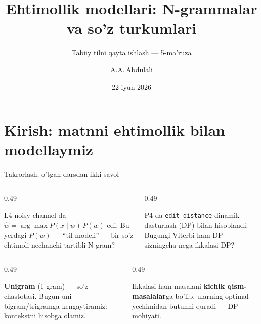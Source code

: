 \documentclass[aspectratio=169,11pt]{beamer}
\title[N-gram va teglash]{Ehtimollik modellari: N-grammalar va so'z turkumlari}
\subtitle{Tabiiy tilni qayta ishlash --- 5-ma'ruza}
\author[A.A.\,Abdulali]{A.A.\,Abdulali}
\date{22-iyun 2026}
\institute{11:00--12:20 \quad$\cdot$\quad mavzu \textnumero{}5}
\begin{document}

\maketitle

\section[Kirish]{Kirish: matnni ehtimollik bilan modellaymiz}

\begin{frame}{Takrorlash: o'tgan darsdan ikki savol}
  \begin{columns}[T]
    \begin{column}{0.49\textwidth}
      \begin{tcolorbox}[warnbox,title=1-savol]
        \small
        L4 noisy channel da $\hat{w}=\arg\max P(x{\mid}w)\,P(w)$ edi.
        Bu yerdagi $P(w)$ --- ``til modeli'' --- bir so'z ehtimoli nechanchi
        tartibli N-gram?
      \end{tcolorbox}
    \end{column}
    \begin{column}{0.49\textwidth}
      \begin{tcolorbox}[warnbox,title=2-savol]
        \small
        P4 da \texttt{edit\_distance} dinamik dasturlash (DP) bilan
        hisoblandi. Bugungi Viterbi ham DP --- sizningcha nega ikkalasi DP?
      \end{tcolorbox}
    \end{column}
  \end{columns}
  \pause
  \vspace{4pt}
  \begin{columns}[T]
    \begin{column}{0.49\textwidth}
      \begin{tcolorbox}[okbox,title=1-javob]
        \small
        \textbf{Unigram} (1-gram) --- so'z chastotasi. Bugun uni
        bigram/trigramga kengaytiramiz: kontekstni hisobga olamiz.
      \end{tcolorbox}
    \end{column}
    \begin{column}{0.49\textwidth}
      \begin{tcolorbox}[okbox,title=2-javob]
        \small
        Ikkalasi ham masalani \textbf{kichik qism-masalalar}ga bo'lib,
        ularning optimal yechimidan butunni quradi --- DP mohiyati.
      \end{tcolorbox}
    \end{column}
  \end{columns}
\end{frame}
\end{document}
